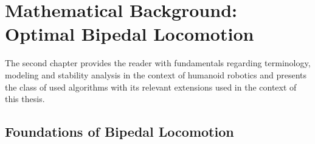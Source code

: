 
\chapter{Mathematical Background: Optimal Bipedal Locomotion}\label{c2}
The second chapter provides the reader with fundamentals regarding terminology, modeling and stability analysis in the context of humanoid robotics and presents the class of used algorithms with its relevant extensions used in the context of this thesis.

\section{Foundations of Bipedal Locomotion}\label{sec:TheoryBiped}
